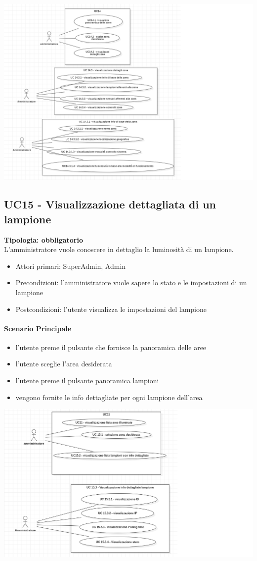 \documentclass[12pt]{article}
\begin{document}
\includegraphics[scale=0.5]{UC14.png}

\subsection{UC15 - Visualizzazione dettagliata di un lampione}
\textbf{Tipologia: obbligatorio} \\
L'amministratore vuole conoscere in dettaglio la luminosità di un lampione.
\begin{itemize}
	\item Attori primari: SuperAdmin, Admin
	\item Precondizioni: l'amministratore vuole sapere lo stato e le impostazioni di un lampione
	\item Postcondizioni: l'utente visualizza le impostazioni del lampione
\end{itemize}
\paragraph{Scenario Principale}
\begin{itemize}
	\item l'utente preme il pulsante che fornisce la panoramica delle aree
	\item l'utente sceglie l'area desiderata
	\item l'utente preme il pulsante panoramica lampioni
	\item vengono fornite le info dettagliate per ogni lampione dell'area
\end{itemize}

\includegraphics[scale=0.5]{UC15.png}
\end{document}
